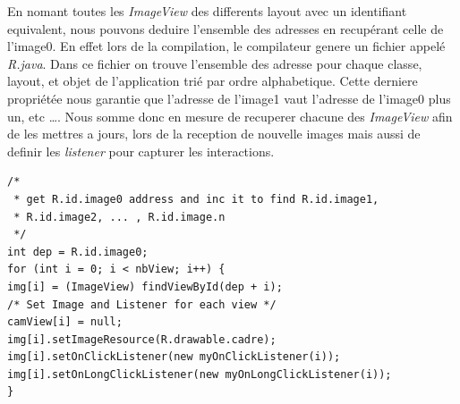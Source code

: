 En nomant toutes les \textit{ImageView} des differents layout avec un
identifiant equivalent, nous pouvons deduire l'ensemble des adresses en
recupérant celle de l'image0.
En effet lors de la compilation, le compilateur genere un fichier appelé
\textit{R.java}. Dans ce fichier on trouve l'ensemble des adresse pour chaque
classe, layout, et objet de l'application trié par ordre alphabetique. Cette
derniere propriétée nous garantie que l'adresse de l'image1 vaut l'adresse de
l'image0 plus un, etc \ldots. Nous somme donc en mesure de recuperer chacune des 
\textit{ImageView} afin de les mettres a jours, lors de la reception de nouvelle
images mais aussi de definir les \textit{listener} pour capturer les
interactions.
\begin{changemargin}{0cm}{0cm}
\begin{lstlisting}[caption={ImageView address resolver}] 
/*
 * get R.id.image0 address and inc it to find R.id.image1,
 * R.id.image2, ... , R.id.image.n
 */
int dep = R.id.image0;
for (int i = 0; i < nbView; i++) {
img[i] = (ImageView) findViewById(dep + i);
/* Set Image and Listener for each view */
camView[i] = null;
img[i].setImageResource(R.drawable.cadre);
img[i].setOnClickListener(new myOnClickListener(i));
img[i].setOnLongClickListener(new myOnLongClickListener(i));
}
\end{lstlisting}   
\end{changemargin}

